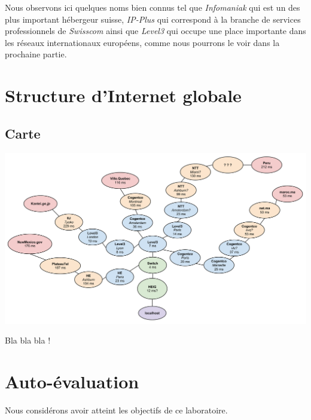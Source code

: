 \documentclass[11pt,a4paper]{article}
\begin{document}
Nous observons ici quelques noms bien connus tel que \textit{Infomaniak} qui est un des plus important hébergeur suisse, \textit{IP-Plus} qui correspond à la branche de services professionnels de \textit{Swisscom} ainsi que \textit{Level3} qui occupe une place importante dans les réseaux internationaux européens, comme nous pourrons le voir dans la prochaine partie.

\section{Structure d'Internet globale}

\subsection{Carte}

\begin{center}
\includegraphics[width=15cm]{img_world}
\end{center}

Bla bla bla !

\section*{Auto-évaluation}

Nous considérons avoir atteint les objectifs de ce laboratoire.
\end{document}
